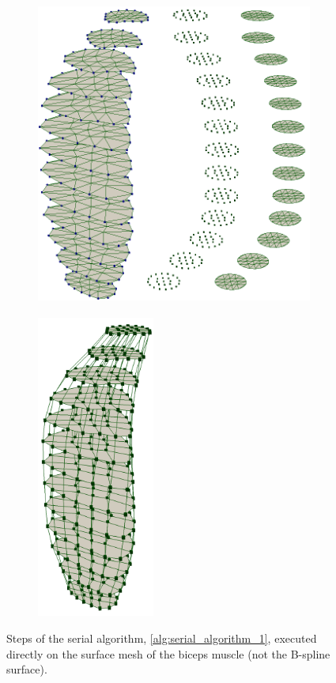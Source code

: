 \begin{figure}
  \centering%
  \begin{subfigure}[t]{0.49\textwidth}%
    \centering%
    \includegraphics[height=10cm]{images/fiber_creation/serial_alg_4.png}%
    \caption{}%
    \label{fig:serial_alg_4}%
  \end{subfigure}
  \hfill{}
  \begin{subfigure}[t]{0.4\textwidth}%
    \centering%
    \includegraphics[height=10cm]{images/fiber_creation/serial_alg_8.png}%
    \caption{}%
    \label{fig:serial_alg_8}%
  \end{subfigure}
  \caption{Steps of the serial algorithm, \cref{alg:serial_algorithm_1}, executed directly on the surface mesh of the biceps muscle (not the B-spline surface).}%
  \label{fig:serial_alg}%
\end{figure}%
%


